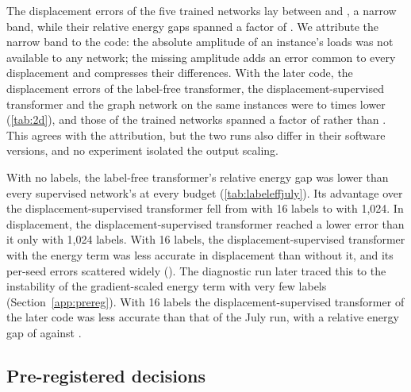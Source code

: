 The displacement errors of the five trained networks lay between \numTwoLabDisp{} and
\numTwoMgnDisp{}, a narrow band, while their relative energy gaps spanned a factor of
\numTwoGapSpread{}. We attribute the narrow band to the code: the absolute amplitude of an
instance's loads was not available to any network; the missing amplitude adds an error common
to every displacement and compresses their differences. With the later code, the displacement errors of the
label-free transformer, the displacement-supervised transformer and the graph network on the
same instances were \numJulyOverCmDispMin{} to \numJulyOverCmDispMax{} times lower
(\cref{tab:2d}), and those of the trained networks spanned a factor of \numCmDispSpread{}
rather than \numTwoDispSpread{}. This agrees with the attribution, but the two runs also
differ in their software versions, and no experiment isolated the output scaling.



With no labels, the label-free transformer's relative energy gap was lower than every
supervised network's at every budget (\cref{tab:labeleffjuly}). Its advantage over the
displacement-supervised transformer fell from \numTwoAdvMax{} with 16 labels to
\numTwoAdvMin{} with 1,024. In displacement, the displacement-supervised transformer reached
a lower error than it only with 1,024 labels. With 16 labels, the displacement-supervised transformer with the
energy term was less accurate in displacement than without it, and its per-seed errors
scattered widely (\numTwoAncSixteenSeeds{}). The diagnostic run later traced this to the
instability of the gradient-scaled energy term with very few labels
(Section~\ref{app:prereg}). With 16 labels the displacement-supervised transformer of the
later code was less accurate than that of the July run, with a relative energy gap of
\numCmLabGapSixteen{} against \numTwoLabGapSixteen{}.

\subsection{Pre-registered decisions}\label{app:july:decisions}

